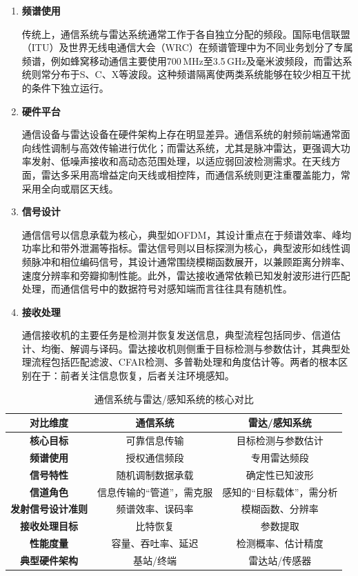\begin{enumerate}[label=(\arabic*)]
    \item \textbf{频谱使用}
    
    传统上，通信系统与雷达系统通常工作于各自独立分配的频段。国际电信联盟（ITU）及世界无线电通信大会（WRC）在频谱管理中为不同业务划分了专属频谱，例如蜂窝移动通信主要使用700\,MHz至3.5\,GHz及毫米波频段，而雷达系统则常分布于S、C、X等波段。这种频谱隔离使两类系统能够在较少相互干扰的条件下独立运行。
    
    \item \textbf{硬件平台}
    
    通信设备与雷达设备在硬件架构上存在明显差异。通信系统的射频前端通常面向线性调制与高效传输进行优化；而雷达系统，尤其是脉冲雷达，更强调大功率发射、低噪声接收和高动态范围处理，以适应弱回波检测需求。在天线方面，雷达多采用高增益定向天线或相控阵，而通信系统则更注重覆盖能力，常采用全向或扇区天线。
    
    \item \textbf{信号设计}
    
    通信信号以信息承载为核心，典型如OFDM，其设计重点在于频谱效率、峰均功率比和带外泄漏等指标\cite{Goldsmith2005,Andrews2014}。雷达信号则以目标探测为核心，典型波形如线性调频脉冲和相位编码信号，其设计通常围绕模糊函数展开，以兼顾距离分辨率、速度分辨率和旁瓣抑制性能\cite{Levanon2004}。此外，雷达接收通常依赖已知发射波形进行匹配处理，而通信信号中的数据符号对感知端而言往往具有随机性\cite{Liu2020JointRadarComm,Zhang2021ISAC6G}。
    
    \item \textbf{接收处理}
    
    通信接收机的主要任务是检测并恢复发送信息，典型流程包括同步、信道估计、均衡、解调与译码\cite{Goldsmith2005}。雷达接收机则侧重于目标检测与参数估计，其典型处理流程包括匹配滤波、CFAR检测、多普勒处理和角度估计等\cite{Skolnik2008,Richards2014}。两者的根本区别在于：前者关注信息恢复，后者关注环境感知。
\end{enumerate}

\begin{table}[!ht]
\centering
\begin{tabular}{|c|c|c|}
\hline
\textbf{对比维度} & \textbf{通信系统} & \textbf{雷达/感知系统} \\
\hline
\textbf{核心目标} & 可靠信息传输 & 目标检测与参数估计 \\
\hline
\textbf{频谱使用} & 授权通信频段 & 专用雷达频段 \\
\hline
\textbf{信号特性} & 随机调制数据承载 & 确定性已知波形 \\
\hline
\textbf{信道角色} & 信息传输的“管道”，需克服 & 感知的“目标载体”，需分析 \\
\hline
\textbf{发射信号设计准则} & 频谱效率、误码率 & 模糊函数、分辨率 \\
\hline
\textbf{接收处理目标} & 比特恢复 & 参数提取 \\
\hline
\textbf{性能度量} & 容量、吞吐率、延迟 & 检测概率、估计精度 \\
\hline
\textbf{典型硬件架构} & 基站/终端 & 雷达站/传感器 \\
\hline
\end{tabular}
\caption{通信系统与雷达/感知系统的核心对比}
\label{tab:comm-vs-radar}
\end{table}

